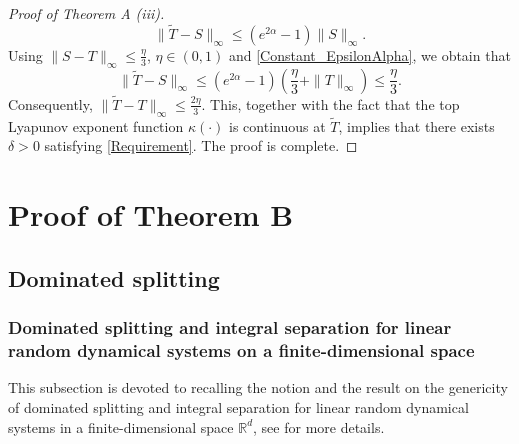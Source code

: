 \documentclass[pdflatex,sn-mathphys-num]{sn-jnl}%
\theoremstyle{thmstyleone}%
\theoremstyle{thmstyletwo}%
\theoremstyle{thmstylethree}%
\newcommand{\R}{\mathbb{R}}
\numberwithin{equation}{section}
\begin{document}
\begin{proof}[Proof of Theorem A (iii)]
\[
\|\widetilde T-S\|_{\infty}\leq (e^{2\alpha}-1)\|S\|_{\infty}.
\]
Using $\|S-T\|_{\infty}\leq \frac{\eta}{3}$, $\eta\in (0,1)$ and \eqref{Constant_EpsilonAlpha}, we obtain that 
\[
\|\widetilde T-S\|_{\infty}\leq (e^{2\alpha}-1)(\frac{\eta}{3}+\|T\|_{\infty})\leq \frac{\eta}{3}.
\]
Consequently, $\|\widetilde T-T\|_{\infty}\leq \frac{2\eta}{3}$. This, together with the fact that the top Lyapunov exponent function $\kappa(\cdot)$ is continuous at $\widetilde T$, implies that there exists $\delta>0$ satisfying \eqref{Requirement}. The proof is complete.
\end{proof}
%
%
\section{Proof of Theorem B}\label{Section_ProofB}
%
\subsection{Dominated splitting}
%
%
\subsubsection{Dominated splitting and integral separation for linear random dynamical systems on a finite-dimensional space}This subsection is devoted to recalling the notion and the result on the genericity of dominated splitting and integral separation for linear random dynamical systems in a finite-dimensional space $\R^d$, see \cite{Bochi2002,Cong05,Cong_Doan16} for more details.
\end{document}
